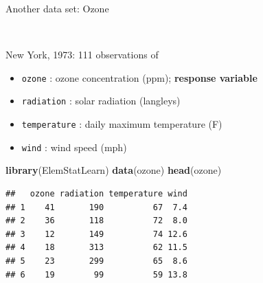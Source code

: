 \documentclass[10pt,ignorenonframetext,]{beamer}
\newenvironment{Shaded}{\begin{snugshade}}{\end{snugshade}}
\newcommand{\KeywordTok}[1]{\textcolor[rgb]{0.13,0.29,0.53}{\textbf{#1}}}
\newcommand{\NormalTok}[1]{#1}
\providecommand{\tightlist}{%
  \setlength{\itemsep}{0pt}\setlength{\parskip}{0pt}}
\begin{document}
\begin{frame}[fragile]

\begin{block}{Another data set: Ozone}

\(~\)

New York, 1973: 111 observations of

\begin{itemize}
\tightlist
\item
  \texttt{ozone} : ozone concentration (ppm); \textbf{response variable}
\item
  \texttt{radiation} : solar radiation (langleys)
\item
  \texttt{temperature} : daily maximum temperature (F)
\item
  \texttt{wind} : wind speed (mph)
\end{itemize}

\scriptsize

\begin{Shaded}
\begin{Highlighting}[]
\KeywordTok{library}\NormalTok{(ElemStatLearn)}
\KeywordTok{data}\NormalTok{(ozone)}
\KeywordTok{head}\NormalTok{(ozone)}
\end{Highlighting}
\end{Shaded}

\begin{verbatim}
##   ozone radiation temperature wind
## 1    41       190          67  7.4
## 2    36       118          72  8.0
## 3    12       149          74 12.6
## 4    18       313          62 11.5
## 5    23       299          65  8.6
## 6    19        99          59 13.8
\end{verbatim}

\end{block}

\end{frame}
\end{document}
